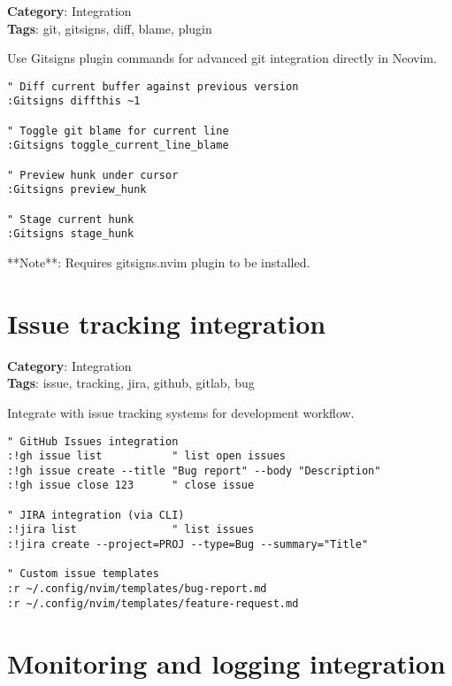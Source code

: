 {{{{{\textbf{Category}: Integration\\ \textbf{Tags}: git, gitsigns, diff, blame, plugin
\vspace{0.5cm}

Use Gitsigns plugin commands for advanced git integration directly in Neovim.

\begin{Exa*}{}
\begin{Verbatim}[fontsize=\footnotesize, breaklines, breakanywhere]
" Diff current buffer against previous version
:Gitsigns diffthis ~1

" Toggle git blame for current line
:Gitsigns toggle_current_line_blame

" Preview hunk under cursor
:Gitsigns preview_hunk

" Stage current hunk
:Gitsigns stage_hunk
\end{Verbatim}
\end{Exa*}

**Note**: Requires gitsigns.nvim plugin to be installed.

\section{Issue tracking integration}

\textbf{Category}: Integration\\ \textbf{Tags}: issue, tracking, jira, github, gitlab, bug
\vspace{0.5cm}

Integrate with issue tracking systems for development workflow.

\begin{Exa*}{}
\begin{Verbatim}[fontsize=\footnotesize, breaklines, breakanywhere]
" GitHub Issues integration
:!gh issue list           " list open issues
:!gh issue create --title "Bug report" --body "Description"
:!gh issue close 123      " close issue

" JIRA integration (via CLI)
:!jira list               " list issues
:!jira create --project=PROJ --type=Bug --summary="Title"

" Custom issue templates
:r ~/.config/nvim/templates/bug-report.md
:r ~/.config/nvim/templates/feature-request.md
\end{Verbatim}
\end{Exa*}

\section{Monitoring and logging integration}

}}}}}
